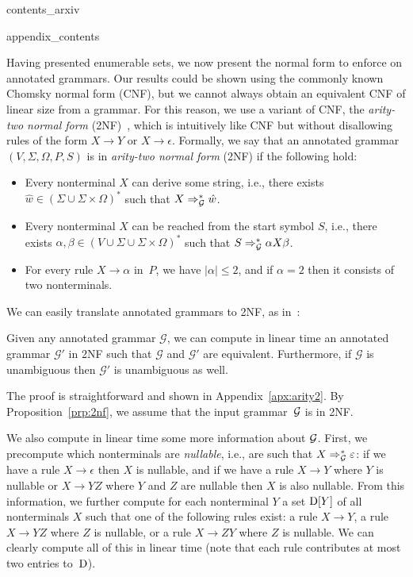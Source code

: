 {contents_arxiv}




\newpage
\appendix
{appendix_contents}




Having presented enumerable sets, we now present the normal form to
enforce on annotated grammars. Our results could be shown using the
commonly known Chomsky normal form (CNF), but we cannot always obtain
an equivalent CNF of linear size from a grammar. For this
reason, we use a variant of CNF, the
\emph{arity-two normal
form} (2NF)~\cite{lange2009cnf}, which is intuitively like CNF but without
disallowing rules of the form $X \rightarrow Y$ or $X \rightarrow \epsilon$. Formally,
  we say that an annotated grammar $(V, \Sigma, \Omega, P, S)$ is in \emph{arity-two normal
  form} (2NF) if the following hold:
  \begin{itemize}
%
%
\item Every nonterminal $X$ can derive some
string, i.e., there exists $\hat{w}\in (\Sigma \cup \Sigma\times \Omega)^*$
such that $X \Rightarrow_{\mathcal{G}}^* \hat{w}$.
\item Every nonterminal $X$ can be
reached from the start symbol $S$, i.e., there exists $\alpha,\beta \in  (V \cup
\Sigma \cup \Sigma \times \Omega)^*$ such that $S \Rightarrow_{\mathcal{G}}^*
\alpha X \beta$.
%
%
%
%
     \item For every rule $X \rightarrow \alpha$ in~$P$, we have $|\alpha| \leq
       2$, and if $\alpha = 2$ then it consists of two nonterminals.
\end{itemize}

We can easily translate annotated grammars to 2NF, as in~\cite{lange2009cnf}:

\begin{proposition}
  \label{prp:2nf}
  Given any annotated grammar\/ $\mathcal{G}$, we can compute in linear time an annotated
  grammar $\mathcal{G}'$ in 2NF such that $\mathcal{G}$ and $\mathcal{G}'$ are
  equivalent. Furthermore, if $\mathcal{G}$ is unambiguous then $\mathcal{G}'$ is unambiguous as well.
\end{proposition}

The proof is straightforward and shown in Appendix~\ref{apx:arity2}.
By Proposition~\ref{prp:2nf}, we assume that the 
input grammar~$\mathcal{G}$ is in 2NF.

We also compute in linear time some more information about $\mathcal{G}$. First, we precompute which
nonterminals are \emph{nullable}, i.e., are such that $X \Rightarrow_{\mathcal{G}}^* \varepsilon$: if we have a rule
$X \rightarrow \epsilon$ then $X$ is nullable, and if we have a
rule $X \rightarrow Y$ where $Y$ is nullable or $X \rightarrow YZ$ where $Y$ and
$Z$ are nullable then $X$ is also nullable. From this information, we further
compute for each nonterminal $Y$ a set $\mathrm{D}[Y]$ of all
nonterminals $X$ such that one of the following rules exist: a rule
$X\rightarrow Y$, a rule $X\rightarrow YZ$ where $Z$ is nullable, or a rule $X\rightarrow ZY$ where $Z$ is
nullable. We can clearly compute all of this in linear time (note that each rule contributes at most two
entries to~$\mathrm{D}$).

